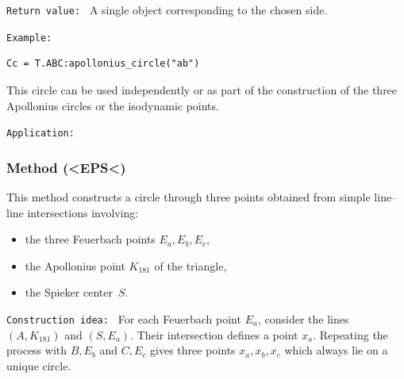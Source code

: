 \medskip
\texttt{Return value: }
A single  object corresponding to the chosen side.

\medskip

\texttt{Example: }
\begin{verbatim}
Cc = T.ABC:apollonius_circle("ab")
\end{verbatim}

This circle can be used independently or as part of the construction of the
three Apollonius circles or the isodynamic points.

\medskip
\texttt{Application: }

\begin{tkzexample}[latex = .5\textwidth]
\begin{center}
\end{center}
\end{tkzexample}



\subsubsection{Method (<EPS<)}
\label{ssub:feuerbach_apollonius_k181}

This method constructs a circle through three points obtained from simple
line--line intersections involving:

\begin{itemize}
  \item the three Feuerbach points $E_a,E_b,E_c$,
  \item the Apollonius point $K_{181}$ of the triangle,
  \item the Spieker center~$S$.
\end{itemize}

\texttt{Construction idea: }
For each Feuerbach point $E_a$, consider the lines
$(A,K_{181})$ and $(S,E_a)$.
Their intersection defines a point $x_a$.
Repeating the process with $B,E_b$ and $C,E_c$ gives three points
$x_a,x_b,x_c$ which always lie on a unique circle.

